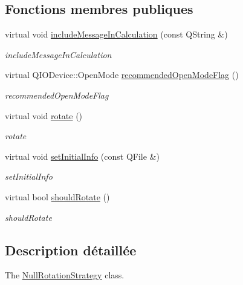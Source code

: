 \subsection*{Fonctions membres publiques}
\begin{DoxyCompactItemize}
\item 
virtual void \hyperlink{classQsLogging_1_1NullRotationStrategy_a66753f83f8f42a3c2bb4c5a54d8dd3ff}{include\-Message\-In\-Calculation} (const Q\-String \&)
\begin{DoxyCompactList}\small\item\em include\-Message\-In\-Calculation \end{DoxyCompactList}\item 
virtual Q\-I\-O\-Device\-::\-Open\-Mode \hyperlink{classQsLogging_1_1NullRotationStrategy_adaa0f8706edc50b1b128c81bbc93b6d9}{recommended\-Open\-Mode\-Flag} ()
\begin{DoxyCompactList}\small\item\em recommended\-Open\-Mode\-Flag \end{DoxyCompactList}\item 
virtual void \hyperlink{classQsLogging_1_1NullRotationStrategy_a32dc2cad39aeffbaeedef1f8e7719a68}{rotate} ()
\begin{DoxyCompactList}\small\item\em rotate \end{DoxyCompactList}\item 
virtual void \hyperlink{classQsLogging_1_1NullRotationStrategy_a58a640b52b61dc256250dd40ab4025b0}{set\-Initial\-Info} (const Q\-File \&)
\begin{DoxyCompactList}\small\item\em set\-Initial\-Info \end{DoxyCompactList}\item 
virtual bool \hyperlink{classQsLogging_1_1NullRotationStrategy_a629d6ede50e0cbde108adb4550247ad6}{should\-Rotate} ()
\begin{DoxyCompactList}\small\item\em should\-Rotate \end{DoxyCompactList}\end{DoxyCompactItemize}


\subsection{Description détaillée}
The \hyperlink{classQsLogging_1_1NullRotationStrategy}{Null\-Rotation\-Strategy} class. 

